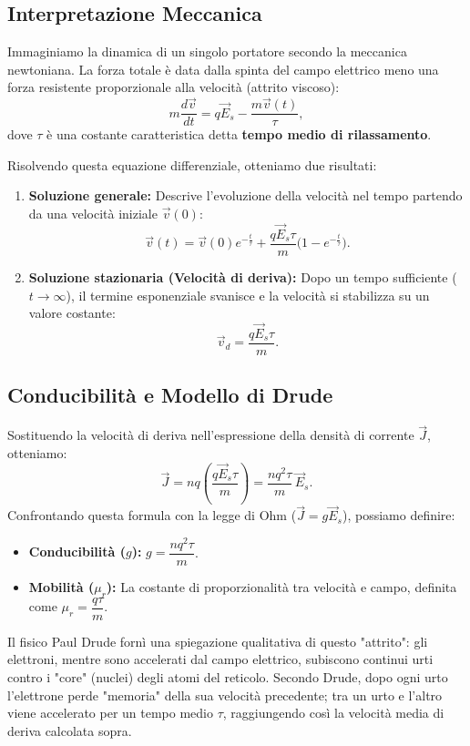 \documentclass{book}
\begin{document}
\subsection*{Interpretazione Meccanica}
Immaginiamo la dinamica di un singolo portatore secondo la meccanica newtoniana. La forza totale è data dalla spinta del campo elettrico meno una forza resistente proporzionale alla velocità (attrito viscoso):
\[
m\frac{d\vec{v}}{dt} = q\vec{E}_s - \frac{m\vec{v}(t)}{\tau},
\]
dove \(\tau\) è una costante caratteristica detta \textbf{tempo medio di rilassamento}.

Risolvendo questa equazione differenziale, otteniamo due risultati:
\begin{enumerate}
    \item \textbf{Soluzione generale:} Descrive l'evoluzione della velocità nel tempo partendo da una velocità iniziale \(\vec{v}(0)\):
    \[
    \vec{v}(t)= \vec{v}(0)e^{-\frac{t}{\tau}} + \frac{q\vec{E}_s \tau}{m}\big(1-e^{-\frac{t}{\tau}}\big).
    \]
    \item \textbf{Soluzione stazionaria (Velocità di deriva):} Dopo un tempo sufficiente (\(t\to\infty\)), il termine esponenziale svanisce e la velocità si stabilizza su un valore costante:
    \[
    \vec{v}_d = \frac{q\vec{E}_s \tau}{m}.
    \]
\end{enumerate}

\subsection*{Conducibilità e Modello di Drude}
Sostituendo la velocità di deriva nell'espressione della densità di corrente \(\vec{J}\), otteniamo:
\[
\vec{J} = n q \left( \frac{q\vec{E}_s \tau}{m} \right) = \frac{n q^2 \tau}{m}\,\vec{E}_s.
\]
Confrontando questa formula con la legge di Ohm (\(\vec{J}=g\vec{E}_s\)), possiamo definire:
\begin{itemize}
    \item \textbf{Conducibilità (\(g\)):} \(g=\dfrac{n q^2 \tau}{m}\).
    \item \textbf{Mobilità (\(\mu_r\)):} La costante di proporzionalità tra velocità e campo, definita come \(\mu_r = \dfrac{q\tau}{m}\).
\end{itemize}

Il fisico Paul Drude fornì una spiegazione qualitativa di questo "attrito": gli elettroni, mentre sono accelerati dal campo elettrico, subiscono continui urti contro i "core" (nuclei) degli atomi del reticolo. Secondo Drude, dopo ogni urto l'elettrone perde "memoria" della sua velocità precedente; tra un urto e l'altro viene accelerato per un tempo medio \(\tau\), raggiungendo così la velocità media di deriva calcolata sopra.
\end{document}
